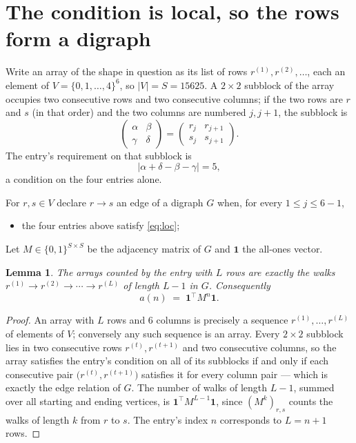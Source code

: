 \documentclass[11pt,a4paper]{article}
\theoremstyle{plain}
\newtheorem{lemma}[theorem]{Lemma}
\theoremstyle{definition}
\begin{document}
\section{The condition is local, so the rows form a digraph}

Write an array of the shape in question as its list of rows
$r^{(1)},r^{(2)},\dots$, each an element of
$V=\{0,1,\dots,4\}^{6}$, so $|V|=S=15625$. A $2\times2$ subblock of the array
occupies two consecutive rows and two consecutive columns; if the two rows are $r$
and $s$ (in that order) and the two columns are numbered $j,j+1$,
the subblock is
\[
\begin{pmatrix}\alpha&\beta\\\gamma&\delta\end{pmatrix}=\begin{pmatrix}r_j&r_{j+1}\\s_j&s_{j+1}\end{pmatrix}.
\]
The entry's requirement on that subblock is
\begin{equation}\label{eq:loc}
|\alpha+\delta-\beta-\gamma|=5,
\end{equation}
a condition on the four entries alone.

For $r,s\in V$ declare $r\to s$ an edge of a digraph $G$ when, for every
$1\le j\le 6-1$,
\begin{itemize}
\item the four entries above satisfy \eqref{eq:loc};

\end{itemize}
Let $M\in\{0,1\}^{S\times S}$ be the adjacency matrix of $G$ and $\mathbf{1}$ the
all-ones vector.

\begin{lemma}\label{lem:walk}
The arrays counted by the entry with $L$ rows are exactly the walks
$r^{(1)}\to r^{(2)}\to\cdots\to r^{(L)}$ of length $L-1$ in $G$. Consequently
\[
a(n)\;=\;\mathbf{1}^{\!\top}M^{n}\mathbf{1} .
\]
\end{lemma}

\begin{proof}
An array with $L$ rows and $6$ columns is precisely a sequence
$r^{(1)},\dots,r^{(L)}$ of elements of $V$; conversely any such sequence is an array.
Every $2\times2$ subblock lies in two consecutive rows $r^{(t)},r^{(t+1)}$ and two
consecutive columns, so the array satisfies the entry's condition on all of its subblocks
if and only if each consecutive pair $\bigl(r^{(t)},r^{(t+1)}\bigr)$ satisfies it for
every column pair --- which is exactly the edge relation of $G$. The number of walks of
length $L-1$, summed over all starting and ending vertices, is
$\mathbf{1}^{\!\top}M^{L-1}\mathbf{1}$, since $(M^{k})_{r,s}$ counts the walks of
length $k$ from $r$ to $s$. The entry's index $n$ corresponds to $L=n+1$ rows.
\end{proof}
\end{document}

